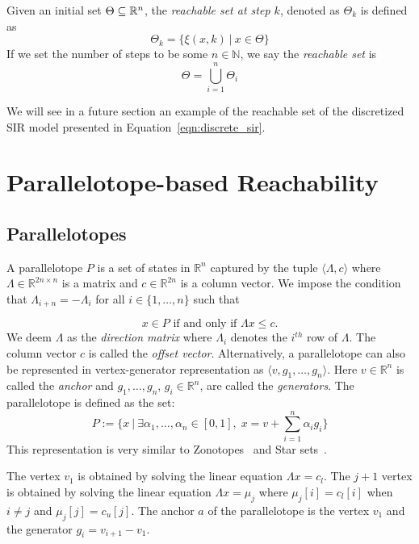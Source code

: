 \begin{definition}
Given an initial set $\Theta \subseteq {\mathbb{R}}^n$, the \emph{reachable set at step $k$}, denoted as $\Theta_k$ is defined as
\begin{equation}
  \Theta_k = \{ \xi(x,k)\: | \: x \in \Theta\}
\label{eq:reachset}
\end{equation}
If we set the number of steps to be some $n \in \mathbb{N}$, we say the \emph{reachable set} is
\begin{equation}
  \Theta = \bigcup_{i=1}^n \Theta_i
\end{equation}
\end{definition}

%
We will see in a future section an example of the reachable set of the discretized SIR model presented in Equation~\ref{eqn:discrete_sir}.


\section{Parallelotope-based Reachability}

\subsection{Parallelotopes}
\label{sec:parallelotope}
A parallelotope $P$ is a set of states in $\mathbb{R}^{n}$ captured by the tuple $\langle \Lambda, c\rangle$ where $\Lambda \in \mathbb{R}^{2n \times n}$ is a matrix and $c \in \mathbb{R}^{2n}$ is a column vector. We impose the condition that $\Lambda_{i+n} = -\Lambda_{i}$ for all $i \in \{1, \ldots, n\}$ such that

$$
x \in P \mbox{ if and only if } \Lambda x \leq c.
$$
We deem $\Lambda$ as the \emph{direction matrix} where $\Lambda_i$ denotes the $i^{th}$ row of $\Lambda$. The column vector $c$ is called the \emph{offset vector}.
%
Alternatively, a parallelotope can also be represented in vertex-generator representation as $\langle v, g_1, \ldots, g_n\rangle$. Here $v \in \mathbb{R}^n$ is called the \emph{anchor} and $g_1, \ldots, g_n$, $g_i \in \mathbb{R}^n$, are called the \emph{generators}. The parallelotope is defined as the set:
$$
P := \{ x ~|~ \exists \alpha_1, \ldots, \alpha_n \in [0,1], \; x = v + \sum_{i=1}^n \alpha_i g_i \}
$$
This representation is very similar to Zonotopes~\cite{girard2005reachability,althoff2010computing} and Star sets~\cite{duggirala2016parsimonious}.

The vertex $v_1$ is obtained by solving the linear equation $\Lambda x = c_{l}$.
%
The $j+1$ vertex is obtained by solving the linear equation $\Lambda x = \mu_{j}$ where $\mu_{j}[i] = c_{l}[i]$ when $i \neq j$ and $\mu_{j}[j] = c_{u}[j]$.
%
The anchor $a$ of the parallelotope is the vertex $v_1$ and the generator $g_{i} = v_{i+1} - v_{1}$.

